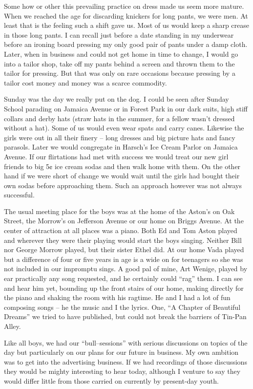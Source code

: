 \documentclass[12pt]{book}              %
\begin{document}
Some how or other this prevailing practice on dress made us seem more mature. When we reached the age for discarding knickers for long pants, we were men. At least that is the feeling such a shift gave us. Most of us would keep a sharp crease in those long pants. I can recall just before a date standing in my underwear before an ironing board pressing my only good pair of pants under a damp cloth. Later, when in business and could not get home in time to change, I would go into a tailor shop, take off my pants behind a screen and thrown them to the tailor for pressing. But that was only on rare occasions because pressing by a tailor cost money and money was a scarce commodity. 

Sunday was the day we really put on the dog. I could be seen after Sunday School parading on Jamaica Avenue or in Forest Park in our dark suits, high stiff collars and derby hats (straw hats in the summer, for a fellow wasn't dressed without a hat). Some of us would even wear spats and carry canes. Likewise the girls were out in all their finery -- long dresses and big picture hats and fancy parasols. Later we would congregate in Harsch's Ice Cream Parlor on Jamaica Avenue. If our flirtations had met with success we would treat our new girl friends to big 5$\cent$ ice cream sodas and then walk home with them. On the other hand if we were short of change we would wait until the girls had bought their own sodas before approaching them. Such an approach however was not always successful. 

The usual meeting place for the boys was at the home of the Aston's on Oak Street, the Morrow's on Jefferson Avenue or our home on Briggs Avenue. At the center of attraction at all places was a piano. Both Ed and Tom Aston played and wherever they were their playing would start the boys singing. Neither Bill nor George Morrow played, but their sister Ethel did. At our home Vada played but a difference of four or five years in age is a wide on for teenagers so she was not included in our impromptu sings. A good pal of mine, Art Wenige, played by ear practically any song requested, and he certainly could ``rag'' them. I can see and hear him yet, bounding up the front stairs of our home, making directly for the piano and shaking the room with his ragtime. He and I had a lot of fun composing songs -- he the music and I the lyrics. One, ``A Chapter of Beautiful Dreams'' we tried to have published, but could not break the barriers of Tin-Pan Alley. 

Like all boys, we had our ``bull--sessions'' with serious discussions on topics of the day but particularly on our plans for our future in business. My own ambition was to get into the advertising business. If we had recordings of those discussions they would be mighty interesting to hear today, although I venture to say they would differ little from those carried on currently by present-day youth.
\end{document}
